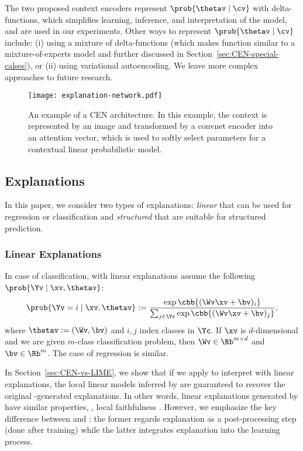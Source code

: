 \documentclass[twoside,11pt]{article}
\begin{document}
\noindent
The two proposed context encoders represent $\prob{\thetav \mid \cv}$ with delta-functions, which simplifies learning, inference, and interpretation of the model, and are used in our experiments.
Other ways to represent $\prob{\thetav \mid \cv}$ include: (i) using a mixture of delta-functions (which makes {\CEN} function similar to a mixture-of-experts model and further discussed in Section~\ref{sec:CEN-special-calses}), or (ii) using variational autoencoding.
We leave more complex approaches to future research.


\begin{figure}[t!]
\centering
\texttt{[image: explanation-network.pdf]}
\caption{An example of a CEN architecture.
In this example, the context is represented by an image and transformed by a convnet encoder into an attention vector, which is used to softly select parameters for a contextual linear probabilistic model.}
\label{fig:explanation-net}
\end{figure}
 

\subsection{Explanations}
\label{sec:explanations}

In this paper, we consider two types of explanations: \emph{linear} that can be used for regression or classification and \emph{structured} that are suitable for structured prediction.

\subsubsection{Linear Explanations}
\label{sec:linear-explanations}

In case of classification, {\CENs} with linear explanations assume the following $\prob{\Yv \mid \xv, \thetav}$:
\begin{equation}
    \label{eq:linear-explanation}
    \prob{\Yv = i \mid \xv, \thetav} := \frac{\exp\cbb{(\Wv \xv + \bv)_i}}{\sum_{j \in \Yc}\exp\cbb{(\Wv \xv + \bv)_j}},
\end{equation}
where $\thetav := (\Wv, \bv)$ and $i, j$ index classes in $\Yc$.
If $\xv$ is $d$-dimensional and we are given $m$-class classification problem, then $\Wv \in \Rb^{m \times d}$ and $\bv \in \Rb^{m}$.
The case of regression is similar.

In Section~\ref{sec:CEN-vs-LIME}, we show that if we apply {\LIME} to interpret {\CEN} with linear explanations, the local linear models inferred by {\LIME} are guaranteed to recover the original {\CEN}-generated explanations.
In other words, linear explanations generated by {\CEN} have similar properties, \eg, local faithfulness  \citep{ribeiro2016trust}.
However, we emphasize the key difference between {\LIME} and {\CEN}: the former regards explanation as a post-processing step (done after training) while the latter integrates explanation into the learning process.
\end{document}
